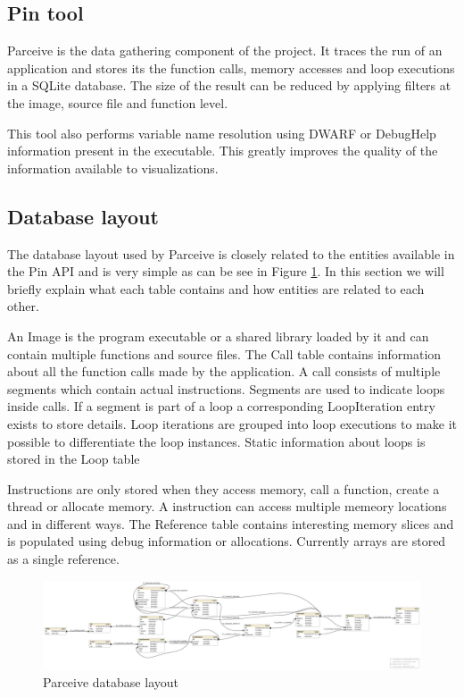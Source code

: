 \subsection{Pin tool}

Parceive is the data gathering component of the project. It traces the run of an application and stores its the function calls, memory accesses and loop executions in a SQLite database. The size of the result can be reduced by applying filters at the image, source file and function level.

This tool also performs variable name resolution using DWARF or DebugHelp information present in the executable. This greatly improves the quality of the information available to visualizations.

\subsection{Database layout}

The database layout used by Parceive is closely related to the entities available in the Pin API and is very simple as can be see in Figure \ref{parceive:layout}. In this section we will briefly explain what each table contains and how entities are related to each other.

An Image is the program executable or a shared library loaded by it and can contain multiple functions and source files. The Call table contains information about all the function calls made by the application. A call consists of multiple segments which contain actual instructions. Segments are used to indicate loops inside calls. If a segment is part of a loop a corresponding LoopIteration entry exists to store details. Loop iterations are grouped into loop executions to make it possible to differentiate the loop instances. Static information about loops is stored in the Loop table

Instructions are only stored when they access memory, call a function, create a thread or allocate memory. A instruction can access multiple memeory locations and in different ways. The Reference table contains interesting memory slices and is populated using debug information or allocations. Currently arrays are stored as a single reference.

\begin{figure}
	\centering
	\includegraphics[width=1\textwidth]{parceive-schema}
	\caption{Parceive database layout}
	\label{parceive:layout}
\end{figure}

